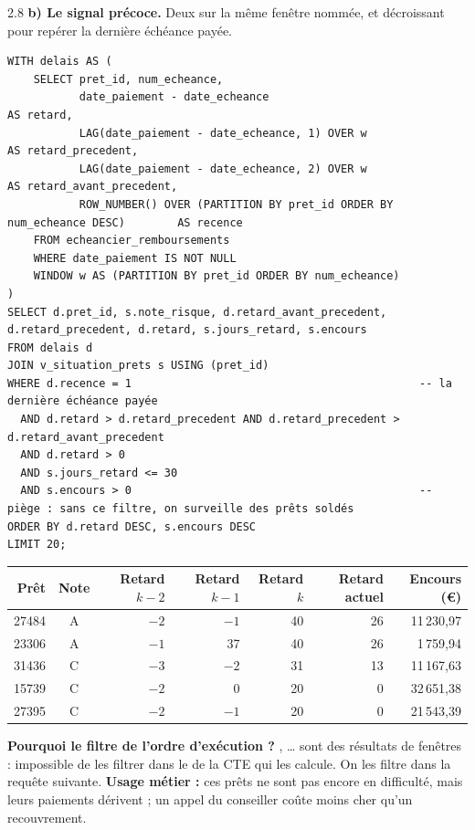 \begin{correction}{2.8}
\textbf{b) Le signal précoce.} Deux  sur la même fenêtre nommée, et 
décroissant pour repérer la dernière échéance payée.
\begin{lstlisting}[style=long]
WITH delais AS (
    SELECT pret_id, num_echeance,
           date_paiement - date_echeance                                              AS retard,
           LAG(date_paiement - date_echeance, 1) OVER w                               AS retard_precedent,
           LAG(date_paiement - date_echeance, 2) OVER w                               AS retard_avant_precedent,
           ROW_NUMBER() OVER (PARTITION BY pret_id ORDER BY num_echeance DESC)        AS recence
    FROM echeancier_remboursements
    WHERE date_paiement IS NOT NULL
    WINDOW w AS (PARTITION BY pret_id ORDER BY num_echeance)
)
SELECT d.pret_id, s.note_risque, d.retard_avant_precedent, d.retard_precedent, d.retard, s.jours_retard, s.encours
FROM delais d
JOIN v_situation_prets s USING (pret_id)
WHERE d.recence = 1                                            -- la dernière échéance payée
  AND d.retard > d.retard_precedent AND d.retard_precedent > d.retard_avant_precedent
  AND d.retard > 0
  AND s.jours_retard <= 30
  AND s.encours > 0                                            -- piège : sans ce filtre, on surveille des prêts soldés
ORDER BY d.retard DESC, s.encours DESC
LIMIT 20;
\end{lstlisting}

\begin{resultat}
\begin{center}\small
\begin{tabular}{@{}rcrrrrr@{}}
\toprule
Prêt & Note & Retard $k-2$ & Retard $k-1$ & Retard $k$ & Retard actuel & Encours (€) \\
\midrule
27484 & A & $-2$ & $-1$ & 40 & 26 & 11\,230,97 \\
23306 & A & $-1$ & 37 & 40 & 26 & 1\,759,94 \\
31436 & C & $-3$ & $-2$ & 31 & 13 & 11\,167,63 \\
15739 & C & $-2$ & 0 & 20 & 0 & 32\,651,38 \\
27395 & C & $-2$ & $-1$ & 20 & 0 & 21\,543,39 \\
\bottomrule
\end{tabular}
\end{center}
\end{resultat}

\textbf{Pourquoi le filtre de l'ordre d'exécution ?} , \dots{} sont
des résultats de fenêtres : impossible de les filtrer dans le  de la CTE qui les calcule.
On les filtre dans la requête suivante. \textbf{Usage métier :} ces prêts ne sont pas encore en
difficulté, mais leurs paiements dérivent ; un appel du conseiller coûte moins cher qu'un recouvrement.
\end{correction}

